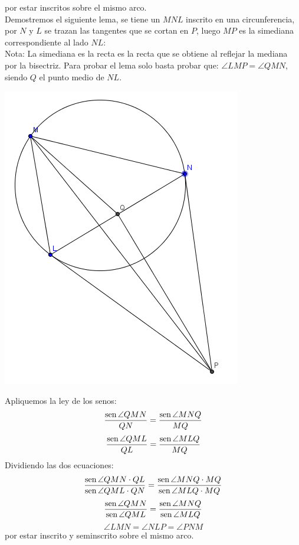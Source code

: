 \documentclass{book}
\newcommand{\sen}{\mathop{\rm sen}\nolimits} %
\begin{document}
\begin{enumerate}
          por estar inscritos sobre el mismo arco.\\
          Demostremos el siguiente lema, se tiene un $MNL$ inscrito en una circunferencia, por $N$ y $L$ se trazan las tangentes que se cortan en $P$, luego $MP$ es la simediana correspondiente al lado $NL$:\\
          Nota: La simediana es la recta es la recta que se obtiene al reflejar la mediana por la bisectriz.
          Para probar el lema solo basta probar que: $\angle LMP=\angle QMN$, siendo $Q$ el punto medio de $NL$.
          \begin{center}
              \includegraphics[scale=1]{imagenes/Geometria/25,2.png}
          \end{center}
          Apliquemos la ley de los senos:
          $${\sen {\angle QMN}\over QN}={\sen {\angle MNQ}\over MQ}$$
          $${\sen {\angle QML}\over QL}={\sen {\angle MLQ}\over MQ}$$
          Dividiendo las dos ecuaciones:
          $$\frac{\sen {\angle QMN}\cdot QL}{\sen {\angle QML}\cdot QN}=\frac{\sen {\angle MNQ}\cdot MQ}{\sen {\angle MLQ}\cdot MQ}$$
          $$\frac{\sen {\angle QMN}}{\sen {\angle QML}}=\frac{\sen {\angle MNQ}}{\sen {\angle MLQ}}$$
          $$\angle LMN=\angle NLP=\angle PNM$$
          por estar inscrito y seminscrito sobre el mismo arco.\\

\end{enumerate}
\end{document}
